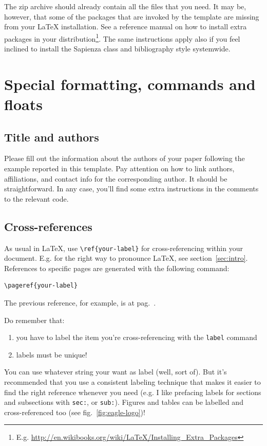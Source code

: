\documentclass[amsthm,ebook]{saparticle}
\begin{document}
The zip archive should already contain all the files that you need. It may be, however, that some of the packages that are invoked by the template are missing from your \LaTeX{} installation. See a reference manual on how to install extra packages in your distribution\footnote{E.g. \url{http://en.wikibooks.org/wiki/LaTeX/Installing_Extra_Packages}}. The same instructions apply also if you feel inclined to install the Sapienza class and bibliography style systemwide.

\section{Special formatting, commands and floats}

\subsection{Title and authors}\label{sub:title}

Please fill out the information about the authors of your paper following the example reported in this template. Pay attention on how to link authors, affiliations, and contact info for the corresponding author. It should be straightforward. In any case, you'll find some extra instructions in the comments to the relevant code.

\subsection{Cross-references}\label{sub:crossref}

As usual in \LaTeX{}, use \verb!\ref{your-label}! for cross-referencing within your document. E.g. for the right way to pronounce \LaTeX, see section~\ref{sec:intro}. References to specific pages are generated with the following command:

\begin{verbatim}
\pageref{your-label}
\end{verbatim}

The previous reference, for example, is at pag.~\pageref{sec:intro}.

Do remember that:
\begin{enumerate}
\item you have to label the item you're cross-referencing with the \texttt{label} command
\item labels must be unique!
\end{enumerate}

You can use whatever string your want as label (well, sort of). But it's recommended that you use a consistent labeling technique that makes it easier to find the right reference whenever you need (e.g. I like prefacing labels for sections and subsections with \texttt{sec:}, or \texttt{sub:}). Figures and tables can be labelled and cross-referenced too (see fig.~\ref{fig:eagle-logo})!
\end{document}
